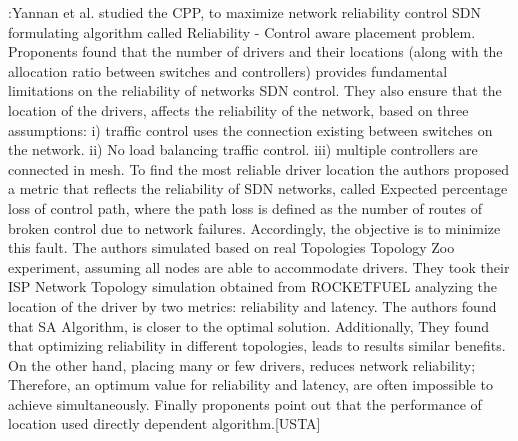 \documentclass[a4paper,10pt]{article}
\begin{document}





\cite{HuWa14}:Yannan et al. studied the CPP, to maximize network reliability control SDN formulating algorithm called Reliability - Control aware placement problem. Proponents found that the number of drivers and their locations (along with the allocation ratio between switches and controllers) provides fundamental limitations on the reliability of networks SDN control. They also ensure that the location of the drivers, affects the reliability of the network, based on three assumptions: i) traffic control uses the connection existing between switches on the network. ii) No load balancing traffic control. iii) multiple controllers are connected in mesh. To find the most reliable driver location the authors proposed a metric that reflects the reliability of SDN networks, called Expected percentage loss of control path, where the path loss is defined as the number of routes of broken control due to network failures. Accordingly, the objective is to minimize this fault. The authors simulated based on real Topologies Topology Zoo experiment, assuming all nodes are able to accommodate drivers. They took their ISP Network Topology simulation obtained from ROCKETFUEL analyzing the location of the driver by two metrics: reliability and latency. The authors found that SA Algorithm, is closer to the optimal solution. Additionally, They found that optimizing reliability in different topologies, leads to results similar benefits. On the other hand, placing many or few drivers, reduces network reliability; Therefore, an optimum value for reliability and latency, are often impossible to achieve simultaneously. Finally proponents point out that the performance of location used directly dependent algorithm.[USTA]
\end{document}
